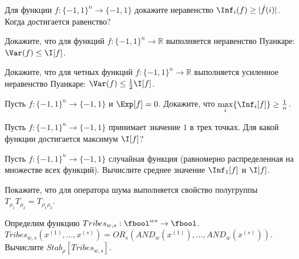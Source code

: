 
\begin{task}
    Для функции $f: \{-1, 1\}^n \to \{-1, 1\}$ докажите неравенство $\Inf_i(f) \ge |\hat f(i)|$. Когда достигается равенство?
\end{task}

\begin{task}
    Докажите, что для функций $f: \{-1, 1\}^n \to \mathbb{R}$ выполняется неравенство Пуанкаре: $\Var(f) \le \I[f]$.
\end{task}

\begin{task}
	Докажите, что для четных функций $f: \{-1, 1\}^n \to \mathbb{R}$ выполняется усиленное неравенство Пуанкаре: $\Var(f) \le
    \frac{1}{2} \I[f]$.
\end{task}

\begin{task}
    Пусть $f: \{-1, 1\}^n \to \{-1, 1\}$ и $\Exp[f] = 0$. Докажите, что $\max\limits_i \{\Inf_i[f]\} \ge \frac{1}{n}$.
\end{task}

\begin{task}
	Пусть $f: \{-1, 1\}^n \to \{-1, 1\}$ принимает значение $1$ в трех точках. Для какой функции достигается максимум $\I[f]$?
\end{task}

\begin{task}
	Пусть $f: \{-1, 1\}^n \to \{-1, 1\}$ случайная функция (равномерно распределенная на множестве всех функций). Вычислите
    среднее значение $\Inf_1[f]$ и $\I[f]$.
\end{task}

\begin{task}
    Покажите, что для оператора шума выполняется свойство полугруппы $T_{\rho_1} T_{\rho_2} = T_{\rho_1 \rho_2}$.
\end{task}

\begin{task}
    Определим функцию $Tribes_{w, s}: \fbool^{w s} \to \fbool$. $Tribes_{w, s}(x^{(1)}, \dots, x^{(s)}) = OR_{s}(AND_w(x^{(1)}),
    \dots, AND_w(x^{(s)}))$. Вычислите $Stab_{\rho}[Tribes_{w, s}]$.
\end{task}



